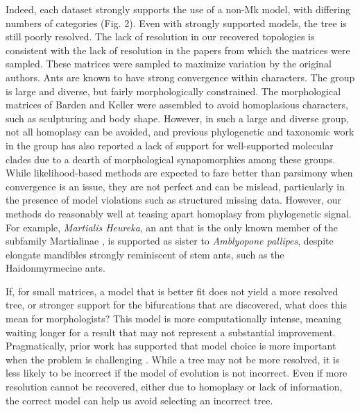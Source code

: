 \documentclass[]{sysbio}
\begin{document}
Indeed, each dataset strongly supports the use of a non-Mk model, with differing numbers of categories (Fig. 2).
Even with strongly supported models, the tree is still poorly resolved.
The lack of resolution in our recovered topologies is consistent with the lack of resolution in the papers from which the matrices were sampled.
These matrices were sampled to maximize variation by the original authors. 
Ants are known to have strong convergence within characters.
The group is large and diverse, but fairly morphologically constrained.
The morphological matrices of Barden and Keller were assembled to avoid homoplasious characters, such as sculpturing and body shape. 
However, in such a large and diverse group, not all homoplasy can be avoided, and previous phylogenetic and taxonomic work in the group has also reported a lack of support for well-supported molecular clades due to a dearth of morphological synapomorphies among these groups. 
While likelihood-based methods are expected to fare better than parsimony when convergence is an issue, they are not perfect and can be mislead, particularly in the presence of model violations such as structured missing data.
However, our methods do reasonably well at teasing apart homoplasy from phylogenetic signal.
For example, \textit{Martialis Heureka}, an ant that is the only known member of the subfamily Martialinae \citep{rabeling2008}, is supported as sister to \textit{Amblyopone pallipes}, despite elongate mandibles strongly reminiscent of stem ants, such as the Haidonmyrmecine ants.
\par
If, for small matrices, a model that is better fit does not yield a more resolved tree, or stronger support for the bifurcations that are discovered, what does this mean for morphologists? 
This model is more computationally intense, meaning waiting longer for a result that may not represent a substantial improvement.
Pragmatically, prior work has supported that model choice is more important when the problem is challenging \citep{wright2014, Wright2016}. 
While a tree may not be more resolved, it is less likely to be incorrect if the model of evolution is not incorrect.
Even if more resolution cannot be recovered, either due to homoplasy or lack of information, the correct model can help us avoid selecting an incorrect tree.
 \par
\end{document}

